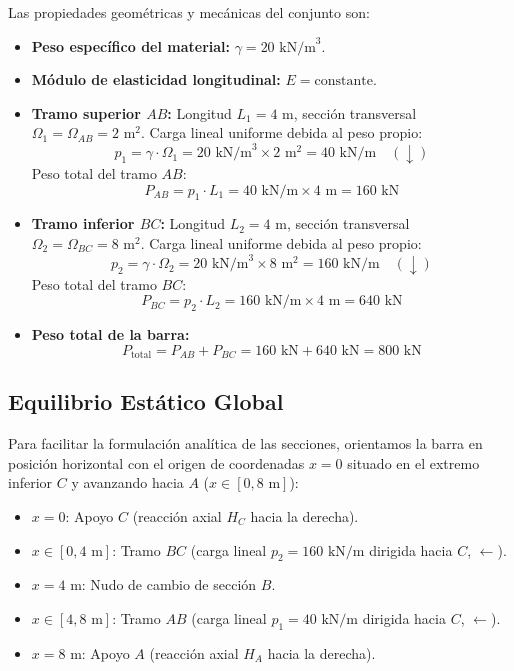 Las propiedades geométricas y mecánicas del conjunto son:
\begin{itemize}
    \item \textbf{Peso específico del material:} $\gamma = 20\text{ kN/m}^3$.
    \item \textbf{Módulo de elasticidad longitudinal:} $E = \text{constante}$.
    \item \textbf{Tramo superior $AB$:} Longitud $L_1 = 4\text{ m}$, sección transversal $\Omega_1 = \Omega_{AB} = 2\text{ m}^2$.
    Carga lineal uniforme debida al peso propio:
    \begin{equation}
        p_1 = \gamma \cdot \Omega_1 = 20\text{ kN/m}^3 \times 2\text{ m}^2 = 40\text{ kN/m} \quad (\downarrow)
    \end{equation}
    Peso total del tramo $AB$:
    \begin{equation}
        P_{AB} = p_1 \cdot L_1 = 40\text{ kN/m} \times 4\text{ m} = 160\text{ kN}
    \end{equation}
    \item \textbf{Tramo inferior $BC$:} Longitud $L_2 = 4\text{ m}$, sección transversal $\Omega_2 = \Omega_{BC} = 8\text{ m}^2$.
    Carga lineal uniforme debida al peso propio:
    \begin{equation}
        p_2 = \gamma \cdot \Omega_2 = 20\text{ kN/m}^3 \times 8\text{ m}^2 = 160\text{ kN/m} \quad (\downarrow)
    \end{equation}
    Peso total del tramo $BC$:
    \begin{equation}
        P_{BC} = p_2 \cdot L_2 = 160\text{ kN/m} \times 4\text{ m} = 640\text{ kN}
    \end{equation}
    \item \textbf{Peso total de la barra:}
    \begin{equation}
        P_{\text{total}} = P_{AB} + P_{BC} = 160\text{ kN} + 640\text{ kN} = 800\text{ kN}
    \end{equation}
\end{itemize}

\subsection{Equilibrio Estático Global}

Para facilitar la formulación analítica de las secciones, orientamos la barra en posición horizontal con el origen de coordenadas $x = 0$ situado en el extremo inferior $C$ y avanzando hacia $A$ ($x \in [0, 8\text{ m}]$):
\begin{itemize}
    \item $x = 0$: Apoyo $C$ (reacción axial $H_C$ hacia la derecha).
    \item $x \in [0, 4\text{ m}]$: Tramo $BC$ (carga lineal $p_2 = 160\text{ kN/m}$ dirigida hacia $C$, $\leftarrow$).
    \item $x = 4\text{ m}$: Nudo de cambio de sección $B$.
    \item $x \in [4, 8\text{ m}]$: Tramo $AB$ (carga lineal $p_1 = 40\text{ kN/m}$ dirigida hacia $C$, $\leftarrow$).
    \item $x = 8\text{ m}$: Apoyo $A$ (reacción axial $H_A$ hacia la derecha).
\end{itemize}

